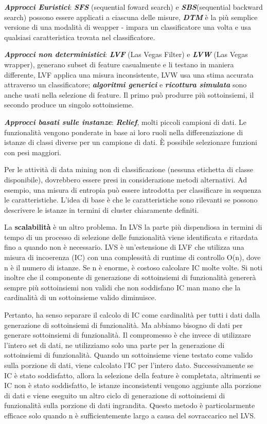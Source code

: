 \documentclass[a4paper]{extarticle}
\begin{document}
\textbf{\textit{Approcci Euristici}}: \textbf{\textit{SFS}} (sequential foward search) e \textbf{\textit{SBS}}(sequential backward search) possono essere applicati a ciascuna delle misure, \textbf{\textit{DTM}} è la più semplice versione  di una modalità di weapper - impara un classificatore una volta e usa qualsiasi caratteristica trovata nel classificatore. 

\textbf{\textit{Approcci non deterministici}}: \textbf{\textit{LVF}} (Las Vegas Filter) e \textbf{\textit{LVW}} (Las Vegas wrapper), generano subset di feature casualmente e li testano in maniera differente, LVF applica una misura inconsistente, LVW usa una stima accurata attraverso un classificatore; \textbf{\textit{algoritmi generici}} e \textbf{\textit{ricottura simulata}} sono anche usati nella selezione di feature. Il primo può produrre più sottoinsiemi, il secondo produce un singolo sottoinsieme.

\textbf{\textit{Approcci basati sulle instanze}}: \textbf{\textit{Relief}}, molti piccoli campioni di dati. Le funzionalità vengono ponderate in base ai loro ruoli nella differenziazione di istanze di classi diverse per un campione di dati. È possibile selezionare funzioni con pesi maggiori. 

Per le attività di data mining non di classificazione (nessuna etichetta di classe disponibile), dovrebbero essere presi in considerazione metodi alternativi. Ad esempio, una misura di entropia può essere introdotta per classificare in sequenza le caratteristiche. L'idea di base è che le caratteristiche sono rilevanti se possono descrivere le istanze in termini di cluster chiaramente definiti.

La \textbf{scalabilità} è un altro problema. In LVS la parte più dispendiosa in termini di tempo di un processo di selezione delle funzionalità viene identificata e ritardata fino a quando non è necessario. LVS è un'estensione di LVF che utilizza una misura di incoerenza (IC) con una complessità di runtime di controllo O(n), dove n è il numero di istanze. Se n è enorme, è costoso calcolare IC molte volte. Si noti inoltre che il componente di generazione di sottoinsiemi di funzionalità genererà sempre più sottoinsiemi non validi che non soddisfano IC man mano che la cardinalità di un sottoinsieme valido diminuisce. 

Pertanto, ha senso separare il calcolo di IC come cardinalità per tutti i dati dalla generazione di sottoinsiemi di funzionalità. Ma abbiamo bisogno di dati per generare sottoinsiemi di funzionalità. Il compromesso è che invece di utilizzare l'intero set di dati, ne utilizziamo solo una parte per la generazione di sottoinsiemi di funzionalità. Quando un sottoinsieme viene testato come valido sulla porzione di dati, viene calcolato l'IC per l'intero dato. Successivamente se IC è stato soddisfatto, allora la selezione della feature è completata, altrimenti se IC non è stato soddisfatto, le istanze inconsistenti vengono aggiunte alla porzione di dati e viene eseguito un altro ciclo di generazione di sottoinsiemi di funzionalità sulla porzione di dati ingrandita. Questo metodo è particolarmente efficace solo quando n è sufficientemente largo a causa del sovraccarico nel LVS.
\end{document}
